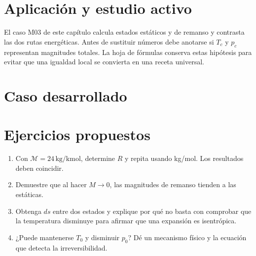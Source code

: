 \section{Aplicación y estudio activo}
El caso M03 de este capítulo calcula estados estáticos y de remanso y contrasta las dos rutas energéticas. Antes de sustituir números debe anotarse si $T_c$ y $p_c$ representan magnitudes totales. La hoja de fórmulas conserva estas hipótesis para evitar que una igualdad local se convierta en una receta universal.
\section{Caso desarrollado}

\section{Ejercicios propuestos}
\begin{enumerate}
\item Con $\mathcal M=24\,\mathrm{kg/kmol}$, determine $R$ y repita usando kg/mol. Los resultados deben coincidir.
\item Demuestre que al hacer $M\to0$, las magnitudes de remanso tienden a las estáticas.
\item Obtenga $ds$ entre dos estados y explique por qué no basta con comprobar que la temperatura disminuye para afirmar que una expansión es isentrópica.
\item ¿Puede mantenerse $T_0$ y disminuir $p_0$? Dé un mecanismo físico y la ecuación que detecta la irreversibilidad.
\end{enumerate}


\studiumchaptercheck
